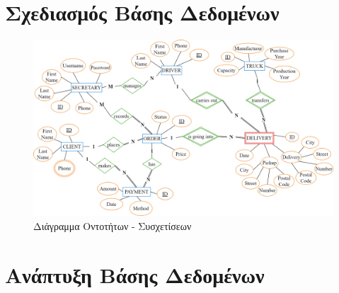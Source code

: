 \documentclass[12pt,a4paper, twoside, notitlepage]{report}
\begin{document}
\pagestyle{mystyle}

{}


{}
\singlespacing
\tableofcontents
\singlespacing
\newpage

\renewcommand{\chaptername}{Μέρος}
\chapter[Μέρος 1: Σχεδιασμός Βάσης Δεδομένων]{Σχεδιασμός Βάσης Δεδομένων}


\begin{figure}
  \centering
      \includegraphics[width=1\textwidth]{images/ER.png}
  \captionsetup{labelfont=bf}
  \caption{Διάγραμμα Οντοτήτων - Συσχετίσεων}
\end{figure}

{}

\newpage
\renewcommand{\chaptername}{Μέρος}
\chapter[Μέρος 2: Ανάπτυξη Βάσης Δεδομένων]{Ανάπτυξη Βάσης Δεδομένων}

\end{document}
